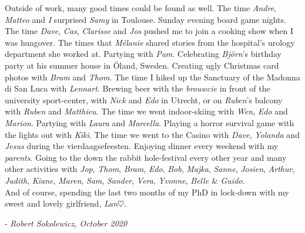 Outside of work, many good times could be found as well. The time \emph{Andre}, \emph{Matteo} and \emph{I} surprised \emph{Samy} in Toulouse. Sunday evening board game nights. The time \emph{Dave}, \emph{Cas}, \emph{Clarisse} and \emph{Jos} pushed me to join a cooking show when I was hungover. The times that \emph{M\'elanie} shared stories from the hospital's urology department she worked at. Partying with \emph{Pam}. Celebrating \emph{Bj\"orn}'s birthday party at his summer house in \"Oland, Sweden. 
Creating ugly Christmas card photos with \emph{Bram} and \emph{Thom}. The time I hiked up the Sanctuary of the Madonna di San Luca with \emph{Lennart}. 
Brewing beer with the \emph{brouwcie} in front of the university sport-center, with \emph{Nick} and \emph{Edo} in Utrecht, or on \emph{Ruben}'s balcony with \emph{Ruben} and \emph{Matthieu}. The time we went indoor-skiing with \emph{Wen}, \emph{Edo} and \emph{Marion}. Partying with \emph{Laura} and \emph{Marcella}. Playing a horror survival game with the lights out with \emph{Kiki}. The time we went to the Casino with \emph{Dave}, \emph{Yolanda} and \emph{Jesus} during the vierdaagsefeesten.  Enjoying dinner every weekend with my \emph{parents}. Going to the down the rabbit hole-festival every other year and many other activities with \emph{Jop}, \emph{Thom}, \emph{Bram}, \emph{Edo}, \emph{Bob}, \emph{Majka}, \emph{Sanne}, \emph{Josien}, \emph{Arthur}, \emph{Judith}, \emph{Kiane}, \emph{Maren}, \emph{Sam}, \emph{Sander}, \emph{Vera}, \emph{Yvonne}, \emph{Belle} \& \emph{Guido}. \\[0.5em]


And of course, spending the last two months of my PhD in lock-down with my sweet and lovely girlfriend, \emph{Lan}$\heartsuit$.

\begin{flushright} - \emph{Robert Sokolewicz, October 2020}\end{flushright}
